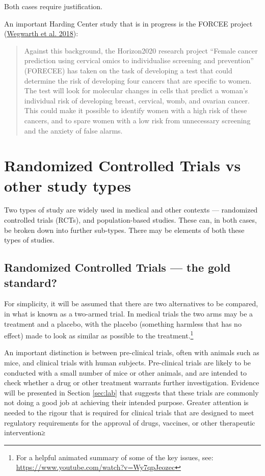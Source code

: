 \documentclass[
  10pt,
  b5paper]{book}
\begin{document}
Both cases require justification.

An important Harding Center study that is in progress is the
FORCEE project (\protect\hyperlink{ref-wegwarth2018european}{Wegwarth et al. 2018}):

\begin{quote}
Against this background, the Horizon2020 research project ``Female cancer prediction using cervical omics to individualise screening and prevention'' (FORECEE) has taken on the task of developing a test that could determine the risk of developing four cancers that are specific to women. The test will look for molecular changes in cells that predict a woman's individual risk of developing breast, cervical, womb, and ovarian cancer. This could make it possible to identify women with a high risk of these cancers, and to spare women with a low risk from unnecessary screening and the anxiety of false alarms.
\end{quote}

\hypertarget{ss:rct}{%
\section{Randomized Controlled Trials vs other study types}\label{ss:rct}}

Two types of study are widely used in medical and other contexts ---
randomized controlled trials (RCTs), and population-based studies.
These can, in both cases, be broken down into further sub-types.
There may be elements of both these types of studies.

\hypertarget{randomized-controlled-trials-the-gold-standard}{%
\subsection*{Randomized Controlled Trials --- the gold standard?}\label{randomized-controlled-trials-the-gold-standard}}

For simplicity, it will be assumed that there are two alternatives
to be compared, in what is known as a two-armed trial. In medical
trials the two arms may be a treatment and a placebo, with the
placebo (something harmless that has no effect) made to look as
similar as possible to the treatment.\footnote{For a helpful animated summary of some of the key issues, see: \url{https://www.youtube.com/watch?v=Wy7qpJeozec}}

An important distinction is between pre-clinical trials, often
with animals such as mice, and clinical trials with human
subjects. Pre-clinical trials are likely to be conducted
with a small number of mice or other animals, and are intended
to check whether a drug or other treatment warrants further
investigation. Evidence will be presented in Section \ref{sec:lab}
that suggests that these trials are commonly not doing a good
job at achieving their intended purpose. Greater attention is
needed to the rigour that is required for clinical trials that
are designed to meet regulatory requirements for the approval
of drugs, vaccines, or other therapeutic intervention≥
\end{document}
